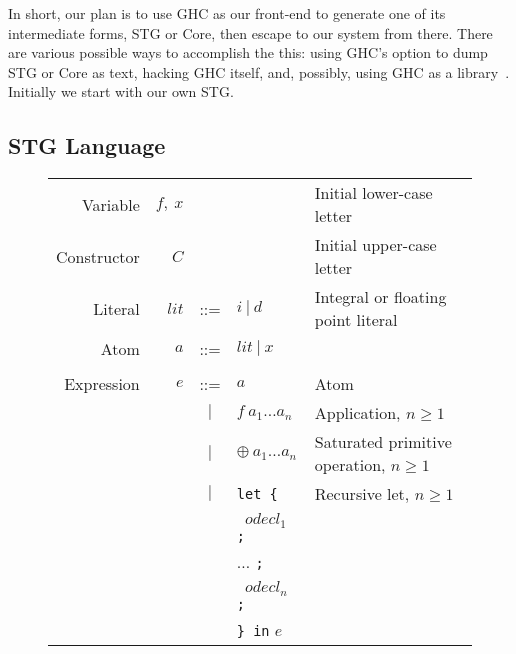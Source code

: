 \documentclass{llncs}
\begin{document}
In short, our plan is to use GHC as our front-end to generate one of its
intermediate forms, STG or Core, then escape to our system from there.  There
are various possible ways to accomplish the this: using GHC's option to dump
STG or Core as text, hacking GHC itself, and, possibly, using GHC as a
library~\cite{ghc-as-library}.  Initially we start with our own STG.

\subsection{STG Language}

\setlength{\tabcolsep}{5pt}
\begin{figure}
\centering
\footnotesize %
\begin{tabular}{r r c l l}
Variable     & $f,\ x$        &     &                                              & Initial lower-case letter \\
Constructor  & $C$            &     &                                              & Initial upper-case letter \\
Literal      & $\mathit{lit}$ & ::= & $i\ |\ d$                                    & Integral or floating point literal \\
Atom         & $a$            & ::= & $\mathit{lit}\ |\ x$                         & \\ %
\\
Expression   & $e$            & ::= & $a$                                          & Atom \\
             &                & $|$ & $f\ a_1\dots a_n$                            & Application, $n\ge 1$ \\
             &                & $|$ & $\oplus\ a_1\dots a_n$                       & Saturated primitive operation, $n\ge 1$ \\

             &                & $|$ & \texttt{let \{}                              & Recursive let, $n\ge 1$ \\
             &                &     & \texttt{ } $\mathit{odecl}_1$ \texttt{;} \\
             &                &     & \hspace{0.2in} $\dots$ \texttt{;} \\
             &                &     & \texttt{ } $\mathit{odecl}_n$ \texttt{;} \\
             &                &     & \texttt{\} in} $e$  \\


\end{tabular}
\end{figure}
\end{document}
